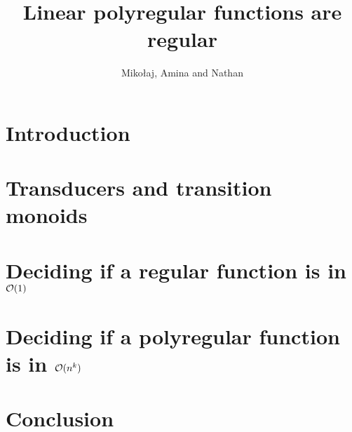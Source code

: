 \documentclass{article}
\begin{document}
 \title{Linear polyregular functions are regular}
 \author{Miko\l aj, Amina  and Nathan}
 \maketitle

\tableofcontents

\section*{Introduction}

\section{Transducers and transition monoids}

\section{Deciding if a regular function is in ${\mathcal O}(1)$}

\section{Deciding if a polyregular function is in ${\mathcal O}(n^k)$}

\section{Conclusion}




\end{document}

